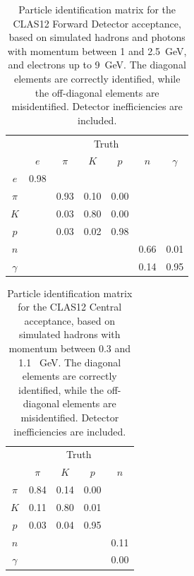 \begin{table}[htpb]
  \begin{center}
    \begin{tabular}{|c|cccccc|}\hline
          & \multicolumn{6}{c|}{Truth}\\        
          & $e$  & $\pi$ & $K$  & $p$  & $n$  & $\gamma$ \\\hline
  $e$     & 0.98 &       &      &      &      &          \\ 
  $\pi$   &      &  0.93 & 0.10 & 0.00 &      &          \\ 
  $K$     &      &  0.03 & 0.80 & 0.00 &      &          \\ 
  $p$     &      &  0.03 & 0.02 & 0.98 &      &          \\ 
  $n$     &      &       &      &      & 0.66 &   0.01   \\ 
 $\gamma$ &      &       &      &      & 0.14 &   0.95   \\\hline 
    \end{tabular}  
    \caption{Particle identification matrix for the CLAS12 Forward Detector acceptance, based on simulated hadrons
      and photons with momentum between 1 and 2.5~GeV, and electrons up to 9~GeV. The diagonal elements are
      correctly identified, while the off-diagonal elements are misidentified. Detector inefficiencies are included.}
  \label{table:pidmatrix}
  \end{center}
\end{table}

\begin{table}[htpb]
  \begin{center}
    \begin{tabular}{|c|cccc|}\hline
          & \multicolumn{4}{c|}{Truth}\\        
          & $\pi$ & $K$  & $p$  & $n$  \\\hline
  $\pi$   &  0.84 & 0.14 & 0.00 &      \\ 
  $K$     &  0.11 & 0.80 & 0.01 &      \\ 
  $p$     &  0.03 & 0.04 & 0.95 &      \\ 
  $n$     &       &      &      & 0.11 \\ 
 $\gamma$ &       &      &      & 0.00 \\\hline 
    \end{tabular}  
    \caption{Particle identification matrix for the CLAS12 Central acceptance, based on simulated hadrons
      with momentum between 0.3 and 1.1 ~GeV. The diagonal elements are
      correctly identified, while the off-diagonal elements are misidentified. Detector inefficiencies are included.}
  \label{table:pidmatrix2}
  \end{center}
\end{table}

